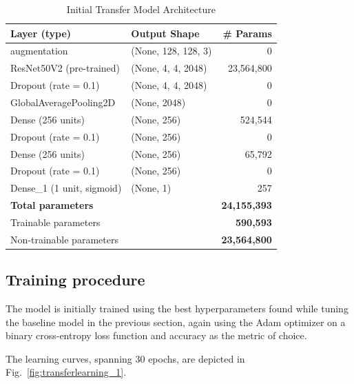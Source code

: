 \documentclass[conference]{IEEEtran}
\begin{document}
\begin{table}[htbp]
	\caption{Initial Transfer Model Architecture}
	\label{table:transfer_cnn_overview}
	\centering
	\begin{adjustbox}{width=0.48\textwidth}
		\begin{tabular}{|l|l|r|}
			\hline
			\textbf{Layer (type)} & \textbf{Output Shape} & \textbf{\# Params} \\
			\hline
			augmentation                   & (None, 128, 128, 3)    &      0  \\
			ResNet50V2 (pre-trained)       & (None, 4, 4, 2048)     & 23,564,800\\
			Dropout (rate = 0.1)           & (None, 4, 4, 2048)     &      0  \\
			GlobalAveragePooling2D         & (None, 2048)           &      0  \\
			Dense (256 units)              & (None, 256)            & 524,544\\
			Dropout (rate = 0.1)           & (None, 256)            &      0  \\
			Dense (256 units)              & (None, 256)            & 65,792\\
			Dropout (rate = 0.1)           & (None, 256)            &      0  \\
			Dense\_1 (1 unit, sigmoid)     & (None, 1)              &     257 \\
			\hline
			\multicolumn{2}{|l|}{\textbf{Total parameters}} & \textbf{24,155,393} \\
			\multicolumn{2}{|l|}{Trainable parameters}       & \textbf{590,593} \\
			\multicolumn{2}{|l|}{Non‑trainable parameters}   & \textbf{23,564,800}\\
			\hline
		\end{tabular}
	\end{adjustbox}
\end{table}

\subsection{Training procedure}
The model is initially trained using the best hyperparameters found while tuning the baseline model in the previous section, again using the Adam optimizer on a binary cross-entropy loss function and accuracy as the metric of choice.

The learning curves, spanning 30 epochs, are depicted in Fig.~\ref{fig:transferlearning_1}.
\end{document}
